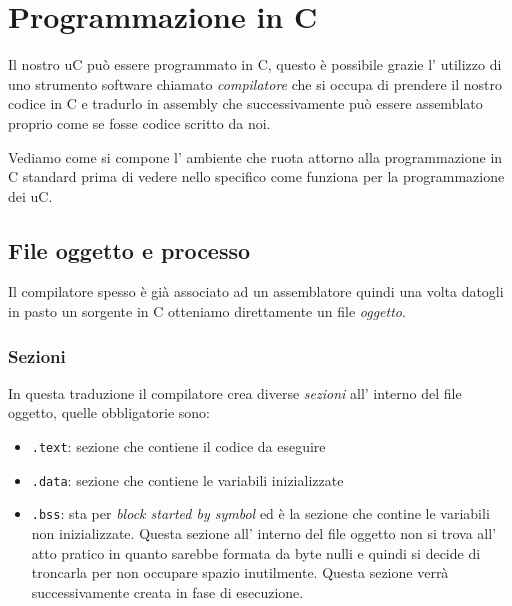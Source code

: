 \section{Programmazione in C}
Il nostro uC può essere programmato in C, questo è possibile grazie l' utilizzo di uno strumento software chiamato \emph{compilatore} che si occupa di prendere il nostro codice in C e tradurlo in assembly che successivamente può essere assemblato proprio come se fosse codice scritto da noi.

Vediamo come si compone l' ambiente che ruota attorno alla programmazione in C standard prima di vedere nello specifico come funziona per la programmazione dei uC.

\subsection{File oggetto e processo}
Il compilatore spesso è già associato ad un assemblatore quindi una volta datogli in pasto un sorgente in C otteniamo direttamente un file \emph{oggetto}.
\subsubsection{Sezioni}
In questa traduzione il compilatore crea diverse \emph{sezioni} all' interno del file oggetto, quelle obbligatorie sono:
\begin{itemize}
    \item \verb{.text{: sezione che contiene il codice da eseguire
    \item \verb{.data{: sezione che contiene le variabili inizializzate
    \item \verb{.bss{: sta per \emph{block started by symbol} ed è la sezione che contine le variabili non inizializzate.
    Questa sezione all' interno del file oggetto non si trova all' atto pratico in quanto sarebbe formata da byte nulli e quindi si decide di troncarla per non occupare spazio inutilmente.
    Questa sezione verrà successivamente creata in fase di esecuzione.
\end{itemize}

